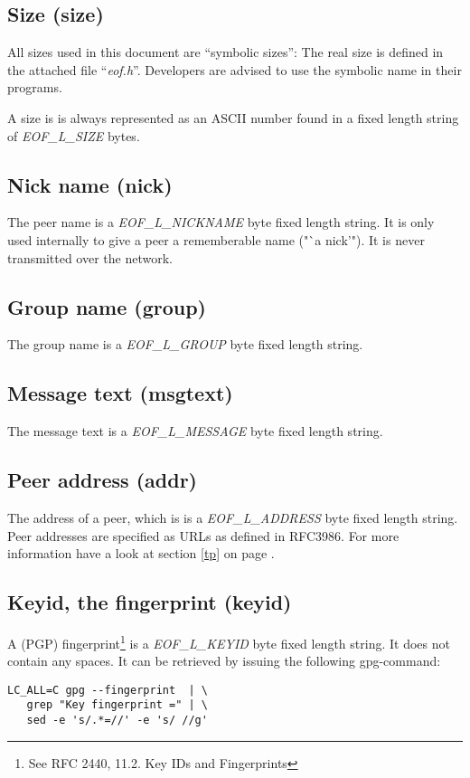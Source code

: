 \documentclass[12pt,a4paper]{book}
\begin{document}
\subsection{Size (size)}
%
All sizes used in this document are "`symbolic sizes"': The real size
is defined in the attached file "`\emph{eof.h}"'.
Developers are advised to use the symbolic name in their programs.

A size is is always represented as an ASCII number found in a
fixed length string of \emph{EOF\_L\_SIZE} bytes.
\subsection{Nick name (nick)}
The peer name is a \emph{EOF\_L\_NICKNAME} byte fixed length string.
It is only used internally to give a peer a rememberable name ("`a nick'").
It is never transmitted over the network.
\subsection{Group name (group)}
The group name is a \emph{EOF\_L\_GROUP} byte fixed length string.
\subsection{Message text (msgtext)}
The message text is a \emph{EOF\_L\_MESSAGE} byte fixed length string.
\subsection{Peer address (addr)}
The address of a peer, which is is a \emph{EOF\_L\_ADDRESS}
byte fixed length string. Peer addresses are specified as
URLs as defined in RFC3986\cite{uri-1}. For more information have
a look at section \ref{tp} on page \pageref{tp}.
\subsection{Keyid, the fingerprint (keyid)}
A (PGP) fingerprint\footnote{See RFC 2440, 11.2. Key IDs and Fingerprints}
is a \emph{EOF\_L\_KEYID} byte fixed length string.
It does not contain any spaces.
It can be retrieved by issuing the following gpg-command:
\begin{verbatim}
LC_ALL=C gpg --fingerprint  | \
   grep "Key fingerprint =" | \
   sed -e 's/.*=//' -e 's/ //g' 
\end{verbatim}
\end{document}

